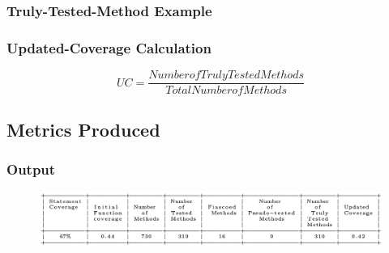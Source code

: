 \begin{frame}
  \frametitle{Truly-Tested-Method Example}
  \begin{center}

  \begin{table}[htbp]

  \end{table}

  \end{center}
\end{frame}

\begin{frame}
\frametitle{Updated-Coverage Calculation}
\begin{center}
  \begin{equation*}
    UC = \frac{Number of TrulyTested Methods}{Total Number of Methods}
  \end{equation*}
\end{center}
\end{frame}

\subsection{Metrics Produced}
\begin{frame}
  \frametitle{Output}

    \begin{figure}
    \includegraphics[scale = .55]{images/tableOutput}
    \end{figure}
\end{frame}
